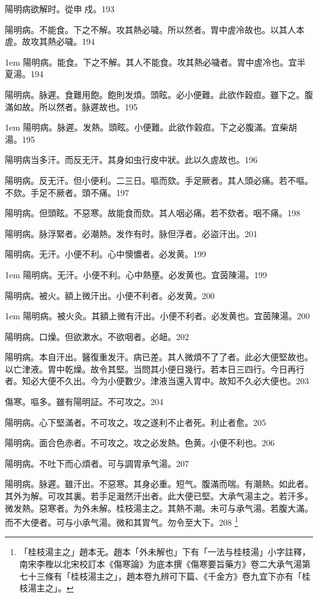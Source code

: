陽明病欲解时。從申{\sungtpii 𥁞}戍。193

陽明病。不能食。下之不解。攻其熱必噦。所以然者。胃中虗冷故也。{\khaaitp 以其人本虗。故攻其熱必噦。}194

\hangindent 1em
陽明病。能食。下之不解。其人不能食。攻其熱必噦者。胃中虗冷也。宜半夏湯。{\gaoben}194

陽明病。脉遲。食難用飽。飽則发煩。頭眩。必小便難。此欲作穀疸。雖下之。腹滿如故。所以然者。脉遲故也。195

\hangindent 1em
陽明病。脉遲。发熱。頭眩。小便難。此欲作榖疸。下之必腹滿。宜柴胡湯。{\gaoben}195

陽明病当多汗。而反无汗。其身如虫行皮中狀。此以久虗故也。196

陽明病。反无汗。但小便利。二三日。嘔而欬。手足厥者。其人頭必痛。若不嘔。不欬。手足不厥者。頭不痛。197

陽明病。但頭眩。不惡寒。故能食而欬。其人咽必痛。若不欬者。咽不痛。198

陽明病。脉浮緊者。必潮熱。发作有时。{\khaaitp 脉}但浮者。必盜汗出。201

陽明病。无汗。小便不利。心中懊憹者。必发黄。199

\hangindent 1em
陽明病。无汗。小便不利。心中熱壅。必发黄也。宜茵陳湯。{\gaoben}199

陽明病。被火。額上微汗出。小便不利者。必发黄。200

\hangindent 1em
陽明病。被火灸。其額上微有汗出。小便不利者。必发黄也。宜茵陳湯。{\gaoben}200

陽明病。口燥。但欲漱水。不欲咽者。必衄。202

陽明病。本自汗出。醫復重发汗。病已差。其人微煩不了了者。此必大便堅故也。以亡津液。胃中乾燥。故令其堅。当問其小便日幾行。若本日三四行。今日再行者。知必大便不久出。今为小便數少。津液当還入胃中。故知不久必大便也。203

傷寒。嘔多。雖有陽明証。不可攻之。204

陽明病。心下堅滿者。不可攻之。攻之遂利不止者死。利止者愈。205

陽明病。面合色赤者。不可攻之。{\khaaitp 攻之}必发熱。色黄。小便不利也。206

陽明病。不吐下而{\khaaitp 心}煩者。可与{\khaaitp 調胃}承气湯。207

陽明病。脉遲。雖汗出。不惡寒。其身必重。短气。腹滿而喘。有潮熱。如此者。其外为解。可攻其裏。若手足濈然汗出者。此大便已堅。{\khaaitp 大}承气湯主之。若汗多。微发熱。惡寒者。为外未解。{\khaaitp 桂枝湯主之。}其熱不潮。未可与承气湯。若腹大滿。而不大便者。可与小承气湯。微和其胃气。勿令至大下。208
	\footnote{
		「桂枝湯主之」趙本无。趙本「外未解也」下有「一法与桂枝湯」小字註釋，南宋李檉以北宋校訂本《傷寒論》为底本撰《傷寒要旨藥方》卷二大承气湯第七十三條有「桂枝湯主之」，趙本卷九辨可下篇、《千金方》卷九宜下亦有「桂枝湯主之」。
	}

